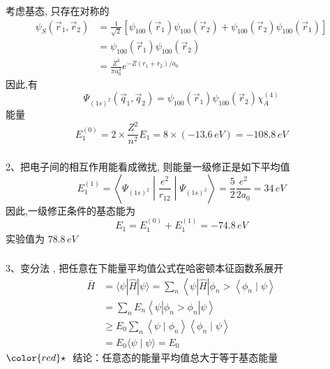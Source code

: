 \begin{frame}[label=current]
  \frametitle{}
考虑基态, 只存在对称的 
$$
\begin{aligned}
  \psi _S \left(\vec{r}_1, \vec{r}_2\right)&=\frac{1}{\sqrt{2}}\left[\psi_{100}\left(\vec{r}_1\right) \psi_{100}\left(\vec{r}_2\right) + \psi_{100}\left(\vec{r}_2\right) \psi_{100}\left(\vec{r}_1\right)\right] \\ 
  &= \psi_{100}\left(\vec{r}_1\right) \psi_{100}\left(\vec{r}_2\right) \\
  &= \frac{Z^3}{\pi a_0^3} e^{-Z\left(r_1+r_2\right) / a_0}
\end{aligned}
$$
因此,有 
\[ \Psi _{(1s)^2}(\vec{q}_1, \vec{q}_2) = \psi_{100}\left(\vec{r}_1\right) \psi_{100}\left(\vec{r}_2\right) \chi ^{(4)} _A \]
能量
\[ E^{(0)}_1 = 2 \times \frac{Z^2}{n^2}E_1 = 8 \times (-13.6 \, eV)  = -108. 8 \, eV\]
\end{frame} 

\begin{frame}[label=current]
  \frametitle{}
2、把电子间的相互作用能看成微扰, 则能量一级修正是如下平均值
\[ E^{(1)}_1 = \left\langle \Psi _{(1s)^2} \middle| \frac{e^2}{r_{12}} \middle| \Psi _{(1s)^2} \right\rangle  = \frac{5}{2} \frac{e^2}{2 a_0}  = 34 \,eV\]
因此,一级修正条件的基态能为
\[ E_1 = E^{(0)}_1 + E^{(1)}_1  =-74.8 \, eV\]
实验值为 $78.8 \, eV$
\end{frame} 

\begin{frame}[label=current]
  \frametitle{}
3、变分法 , 把任意在下能量平均值公式在哈密顿本征函数系展开
$$
\begin{aligned}
\bar{H} & =\langle\psi|\hat{H}| \psi\rangle=\sum_n\left\langle\psi|\hat{H}| \phi_n>\left\langle\phi_n \mid \psi\right\rangle\right. \\
& =\sum_n E_n\left\langle\psi\left|\phi_n>\phi_n\right| \psi\right\rangle  \\
& \geq E_0 \sum_n\left\langle\psi \mid \phi_n\right\rangle\left\langle\phi_n \mid \psi\right\rangle \\
& =E_0\langle\psi \mid \psi\rangle=E_0
\end{aligned}
$$ 
${\color{red}\star}~$ 结论：任意态的能量平均值总大于等于基态能量
\end{frame} 

